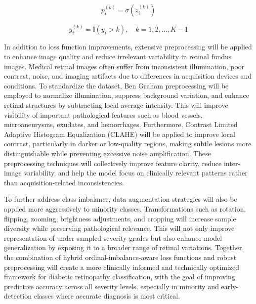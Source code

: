 \[
p_i^{(k)} = \sigma(z_i^{(k)})
\]

\[
y_i^{(k)} = \mathbb{I}(y_i > k), \quad k = 1,2,\dots,K-1
\]

In addition to loss function improvements, extensive preprocessing will be applied to enhance image quality and reduce
irrelevant variability in retinal fundus images. Medical retinal images often suffer from inconsistent illumination,
poor contrast, noise, and imaging artifacts due to differences in acquisition devices and conditions. To standardize
the dataset, Ben Graham preprocessing will be employed to normalize illumination, suppress background variation, and enhance
retinal structures by subtracting local average intensity. This will improve visibility of important pathological
features such as blood vessels, microaneurysms, exudates, and hemorrhages. Furthermore, Contrast Limited Adaptive Histogram
Equalization (CLAHE) will be applied to improve local contrast, particularly in darker or low-quality regions, making subtle
lesions more distinguishable while preventing excessive noise amplification. These preprocessing techniques will collectively
improve feature clarity, reduce inter-image variability, and help the model focus on clinically relevant patterns rather
than acquisition-related inconsistencies.

To further address class imbalance, data augmentation strategies will also be applied more aggressively to minority
classes. Transformations such as rotation, flipping, zooming, brightness adjustments, and cropping will increase sample
diversity while preserving pathological relevance. This will not only improve representation of under-sampled severity
grades but also enhance model generalization by exposing it to a broader range of retinal variations. Together,
the combination of hybrid ordinal-imbalance-aware loss functions and robust preprocessing will create a more clinically
informed and technically optimized framework for diabetic retinopathy classification, with the goal of improving
predictive accuracy across all severity levels, especially in minority and early-detection classes where accurate
diagnosis is most critical.

